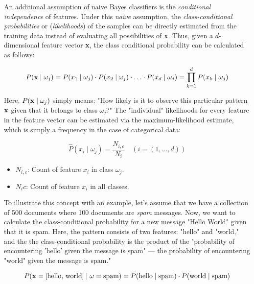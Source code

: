 \documentclass{article}
\begin{document}
An additional assumption of naive Bayes classifiers is the \emph{conditional independence} of features. Under this \emph{naive} assumption, the \emph{class-conditional probabilities} or (\emph{likelihoods}) of the samples can be directly estimated from the training data instead of evaluating all possibilities of \textbf{x}. Thus, given a $d$-dimensional feature vector \textbf{x}, the class conditional probability can be calculated as follows:

\begin{equation} P(\textbf x \mid \omega_j) = P(x_1 \mid \omega_j) \cdot P(x_2 \mid \omega_j) \cdot \ldots \cdot P(x_d \mid \omega_j) =  \prod_{k=1}^{d} P( x_k \mid \omega_j) \end{equation}

Here, $P(\textbf x \mid \omega_j)$ simply means: "How likely is it to observe this particular pattern $\textbf x$ given that it belongs to class $ \omega_j$?" The "individual" likelihoods for every feature in the feature vector can be estimated via the maximum-likelihood estimate, which is simply a frequency in the case of categorical data:
    
\begin{equation} \hat{P}(x_i \mid \omega_j) = \frac{N_{i,c}}{N_i}  \quad (i = (1, ..., d))\end{equation}

\begin{itemize}
	\item $N_{i,c}$: Count of feature $x_i$ in class $\omega_j$.
	\item  $N_ic$: Count of feature $x_i$ in all classes.
\end{itemize}

To illustrate this concept with an example, let's assume that we have a collection of 500 documents where 100 documents are \emph{spam} messages. Now, we want to calculate the class-conditional probability for a new message "Hello World" given that it is spam.
Here, the pattern consists of two features: "hello" and "world," and the the class-conditional probability is the product of the "probability of encountering 'hello' given the message is spam" --- the probability of encountering "world" given the message is spam."

\begin{equation} P(\textbf x=[\text{hello, world}] \mid \omega=\text{spam}) = P(\text{hello} \mid \text{spam}) \cdot P(\text{world} \mid \text{spam}) \end{equation}
\end{document}
